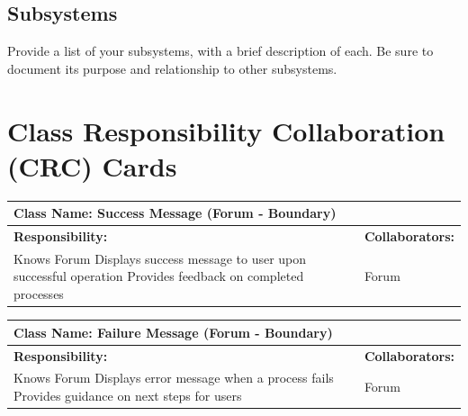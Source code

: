 \documentclass[]{article}
\begin{document}
\subsection{Subsystems}
\label{sub:subsystems}
 Provide a list of your subsystems, with a brief description of each. Be sure to document its purpose and relationship to other subsystems.


	
\section{Class Responsibility Collaboration (CRC) Cards}
\label{sec:class_responsibility_collaboration_crc_cards}

	\begin{table}[H]
	    \centering
	    \begin{tabular}{|p{7cm}|p{7cm}|}
	    \hline 
	     \multicolumn{2}{|l|}{\textbf{Class Name: Success Message (Forum - Boundary)}} \\
	    \hline
	    \textbf{Responsibility:} & \textbf{Collaborators:} \\
	    \hline
	    Knows Forum \newline
	    Displays success message to user upon successful operation \newline
	    Provides feedback on completed processes & 		
	    Forum \\
	    \hline
	    \end{tabular}
	\end{table}
	
	\begin{table}[H]
	    \centering
	    \begin{tabular}{|p{7cm}|p{7cm}|}
	    \hline 
	     \multicolumn{2}{|l|}{\textbf{Class Name: Failure Message (Forum - Boundary)}} \\
	    \hline
	    \textbf{Responsibility:} & \textbf{Collaborators:} \\
	    \hline
	    Knows Forum \newline
	    Displays error message when a process fails \newline
	    Provides guidance on next steps for users & 		
	    Forum \\
	    \hline
	    \end{tabular}
	\end{table}
	
\end{document}
